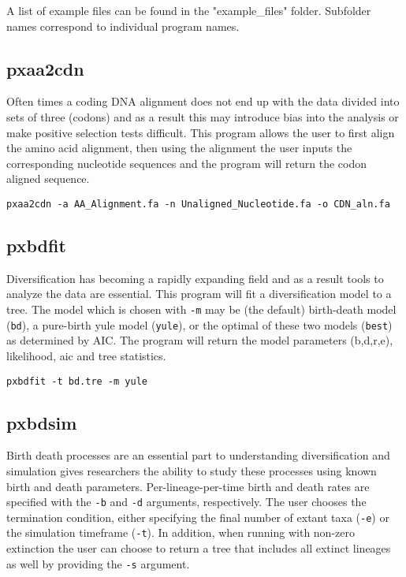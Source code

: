 \documentclass[12pt,letterpaper]{memoir}
\begin{document}
A list of example files can be found in the "example\_files" folder. Subfolder names correspond to individual program names.

\subsection{pxaa2cdn}

Often times a coding DNA alignment does not end up with the data divided into sets of three (codons) and as a result this may introduce bias into the analysis or make positive selection tests difficult. This program allows the user to first align the amino acid alignment, then using the alignment the user inputs the corresponding nucleotide sequences and the program will return the codon aligned sequence.
\begin{flushleft}
\begin{verbatim}
pxaa2cdn -a AA_Alignment.fa -n Unaligned_Nucleotide.fa -o CDN_aln.fa
\end{verbatim}
\end{flushleft}

\subsection{pxbdfit}

Diversification has becoming a rapidly expanding field and as a result tools to analyze the data are essential. This program will fit a diversification model to a tree. The model which is chosen with \texttt{-m} may be (the default) birth-death model (\texttt{bd}), a pure-birth yule model (\texttt{yule}), or the optimal of these two models (\texttt{best}) as determined by AIC. The program will return the model parameters (b,d,r,e), likelihood, aic and tree statistics.
\begin{flushleft}
\begin{verbatim}
pxbdfit -t bd.tre -m yule
\end{verbatim}
\end{flushleft}

\subsection{pxbdsim}

Birth death processes are an essential part to understanding diversification and simulation gives researchers the ability to study these processes using known birth and death parameters. Per-lineage-per-time birth and death rates are specified with the \texttt{-b} and \texttt{-d} arguments, respectively. The user chooses the termination condition, either specifying the final number of extant taxa (\texttt{-e}) or the simulation timeframe (\texttt{-t}). In addition, when running with non-zero extinction the user can choose to return a tree that includes all extinct lineages as well by providing the \texttt{-s} argument.
\end{document}
